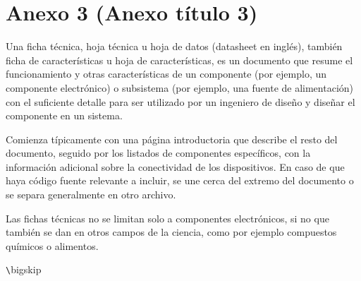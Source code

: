 \chapter{Anexo 3 (Anexo título 3)}\label{anexo3}

Una ficha técnica, hoja técnica u hoja de datos (datasheet en inglés), también ficha de características u hoja de características, es un documento que resume el funcionamiento y otras características de un componente (por ejemplo, un componente electrónico) o subsistema (por ejemplo, una fuente de alimentación) con el suficiente detalle para ser utilizado por un ingeniero de diseño y diseñar el componente en un sistema.

Comienza típicamente con una página introductoria que describe el resto del documento, seguido por los listados de componentes específicos, con la información adicional sobre la conectividad de los dispositivos. En caso de que haya código fuente relevante a incluir, se une cerca del extremo del documento o se separa generalmente en otro archivo.

Las fichas técnicas no se limitan solo a componentes electrónicos, si no que también se dan en otros campos de la ciencia, como por ejemplo compuestos químicos o alimentos.

\verb+\+bigskip





\endinput 